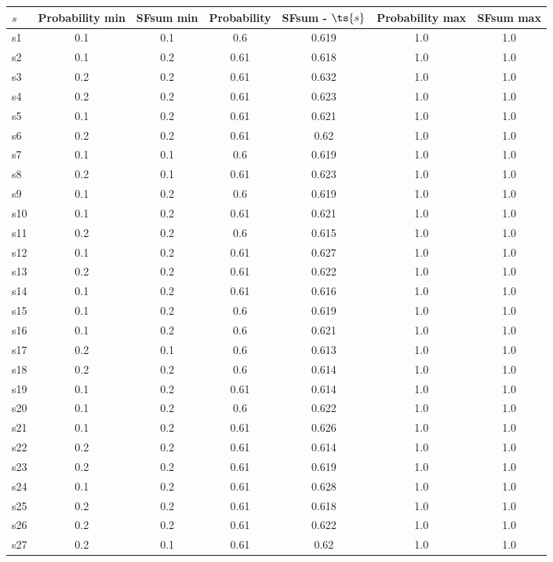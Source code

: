 \documentclass{article}
\begin{document}
\noindent\begin{tabular}{|l|c|c|c|c|c|c|}
\hline
$s$& Probability min & SFsum min & Probability & SFsum - $\ts{s}$ & Probability max & SFsum max\\
\hline
s1 &0.1 & 0.1 & 0.6 & 0.619 & 1.0 & 1.0\\
\hline
s2 &0.1 & 0.2 & 0.61 & 0.618 & 1.0 & 1.0\\
\hline
s3 &0.2 & 0.2 & 0.61 & 0.632 & 1.0 & 1.0\\
\hline
s4 &0.2 & 0.2 & 0.61 & 0.623 & 1.0 & 1.0\\
\hline
s5 &0.1 & 0.2 & 0.61 & 0.621 & 1.0 & 1.0\\
\hline
s6 &0.2 & 0.2 & 0.61 & 0.62 & 1.0 & 1.0\\
\hline
s7 &0.1 & 0.1 & 0.6 & 0.619 & 1.0 & 1.0\\
\hline
s8 &0.2 & 0.1 & 0.61 & 0.623 & 1.0 & 1.0\\
\hline
s9 &0.1 & 0.2 & 0.6 & 0.619 & 1.0 & 1.0\\
\hline
s10 &0.1 & 0.2 & 0.61 & 0.621 & 1.0 & 1.0\\
\hline
s11 &0.2 & 0.2 & 0.6 & 0.615 & 1.0 & 1.0\\
\hline
s12 &0.1 & 0.2 & 0.61 & 0.627 & 1.0 & 1.0\\
\hline
s13 &0.2 & 0.2 & 0.61 & 0.622 & 1.0 & 1.0\\
\hline
s14 &0.1 & 0.2 & 0.61 & 0.616 & 1.0 & 1.0\\
\hline
s15 &0.1 & 0.2 & 0.6 & 0.619 & 1.0 & 1.0\\
\hline
s16 &0.1 & 0.2 & 0.6 & 0.621 & 1.0 & 1.0\\
\hline
s17 &0.2 & 0.1 & 0.6 & 0.613 & 1.0 & 1.0\\
\hline
s18 &0.2 & 0.2 & 0.6 & 0.614 & 1.0 & 1.0\\
\hline
s19 &0.1 & 0.2 & 0.61 & 0.614 & 1.0 & 1.0\\
\hline
s20 &0.1 & 0.2 & 0.6 & 0.622 & 1.0 & 1.0\\
\hline
s21 &0.1 & 0.2 & 0.61 & 0.626 & 1.0 & 1.0\\
\hline
s22 &0.2 & 0.2 & 0.61 & 0.614 & 1.0 & 1.0\\
\hline
s23 &0.2 & 0.2 & 0.61 & 0.619 & 1.0 & 1.0\\
\hline
s24 &0.1 & 0.2 & 0.61 & 0.628 & 1.0 & 1.0\\
\hline
s25 &0.2 & 0.2 & 0.61 & 0.618 & 1.0 & 1.0\\
\hline
s26 &0.2 & 0.2 & 0.61 & 0.622 & 1.0 & 1.0\\
\hline
s27 &0.2 & 0.1 & 0.61 & 0.62 & 1.0 & 1.0\\

\end{tabular}
\end{document}
